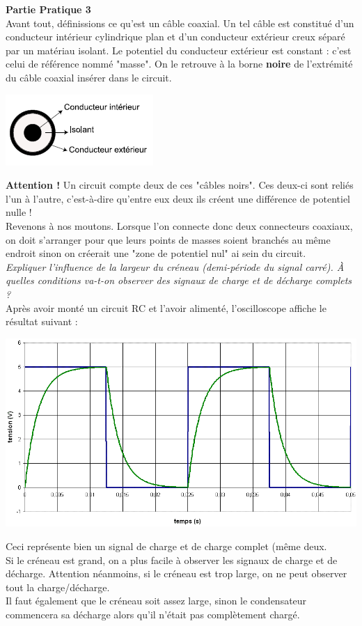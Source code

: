 \documentclass	[11pt, a4paper, openany]{book}
\begin{document}
\textbf{Partie Pratique 3}\\
Avant tout, définissions ce qu'est un câble coaxial. Un tel câble est constitué d'un conducteur intérieur cylindrique plan et d'un conducteur extérieur creux séparé par un matériau isolant. Le potentiel du conducteur extérieur est constant : c'est celui de référence nommé "masse". On le retrouve à la borne \textbf{noire} de l'extrémité du câble coaxial insérer dans le circuit.
\begin{center}
\includegraphics[scale=0.5]{labo/image18.png}
\end{center}
\textbf{Attention !} Un circuit compte deux de ces "câbles noirs". Ces deux-ci sont reliés l'un à l'autre, c'est-à-dire qu'entre eux deux ils créent une différence de potentiel nulle !\\


Revenons à nos moutons. Lorsque l'on connecte donc deux connecteurs coaxiaux, on doit s'arranger pour que leurs points de masses soient branchés au même endroit sinon on créerait une "zone de potentiel nul" ai sein du circuit.\\

\textit{Expliquer l'influence de la largeur du créneau (demi-période du signal carré). À quelles conditions va-t-on observer des signaux de charge et de décharge complets ?}\\
Après avoir monté un circuit RC et l'avoir alimenté, l'oscilloscope affiche le résultat suivant : 
\begin{center}
\includegraphics[scale=0.3]{labo/image19.png}
\end{center}
Ceci représente bien un signal de charge et de charge complet (même deux.\\
Si le créneau est grand, on a plus facile à observer les signaux de charge et de décharge. Attention néanmoins, si le créneau est trop large, on ne peut observer tout la charge/décharge.\\
Il faut également que le créneau soit assez large, sinon le condensateur commencera sa décharge alors qu'il n'était pas complètement chargé.\\
\end{document}
